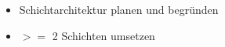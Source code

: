 \begin{itemize}
	\item Schichtarchitektur planen und begründen
	\item $>=$ 2 Schichten umsetzen
\end{itemize}
